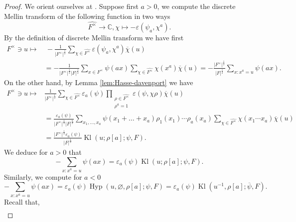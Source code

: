 \documentclass[12pt]{amsart}
\theoremstyle{plain}
\theoremstyle{definition}
\theoremstyle{remark}
\numberwithin{equation}{section}
\newcommand{\CC}{\mathbb{C}}
\DeclareMathOperator{\Kl}{Kl}%
\begin{document}
\begin{proof}
  We orient ourselves at \cite{FKMSthirdmom}. Suppose first $a>0$, we compute the discrete Mellin transform of the following function in two ways 
\begin{equation}\label{eq:Hasse-davenport2}
    \widehat{F^{\times}}\rightarrow \CC, \chi \mapsto -\varepsilon(\psi_a,\chi^a).
\end{equation}
By the definition of discrete Mellin transform we have first 
\begin{align}\label{eq:Hasse-davenport3}
    F^{\times}\ni u\mapsto&\ -\frac{1}{\vert{F^{\times}}\vert^{\frac{1}{2}}}\sum_{\chi \in \widehat{F^{\times}}}\varepsilon(\psi_a,\chi^a)\overline{\chi}(u) \nonumber \\ &=-\frac{1}{\vert{F^{\times}}\vert^{\frac{1}{2}}\vert{F}\vert^{\frac{1}{2}}}\sum_{x\in F^{\times}}\psi(ax)\sum_{\chi \in \widehat{F^{\times}}}\chi(x^a)\overline{\chi}(u) = -\frac{\vert{F^{\times}}\vert^{\frac{1}{2}}}{\vert{F}\vert^{\frac{1}{2}}}\sum_{x\colon x^a=u}\psi(ax).
\end{align}
On the other hand, by Lemma \ref{lem:Hasse-davenport} we have
\begin{align}\label{eq:Hasse-davenport4}
F^{\times}\ni u\mapsto & \frac{1}{\vert{F^{\times}}\vert^{\frac{1}{2}}}\sum_{\chi\in \widehat{F^{\times}}}\varepsilon_a(\psi)\prod_{\substack{\rho \in \widehat{F^{\times}}\\\rho^a=1}}\varepsilon(\psi,\chi\rho)\overline{\chi}(u) \nonumber \\ &= \frac{\varepsilon_a(\psi)}{\vert{F^{\times}}\vert^{\frac{1}{2}}\vert{F}\vert^{\frac{a}{2}}}\sum_{x_1,\dots,x_a}\psi(x_1+\dots+x_a)\rho_1(x_1)\cdots\rho_a(x_a)\sum_{\chi\in \widehat{F^{\times}}}\chi(x_1\cdots x_a)\overline{\chi}(u)\nonumber \\ &=\frac{\vert{F^{\times}}\vert^{\frac{1}{2}}\varepsilon_a(\psi)}{\vert{F}\vert^{\frac{1}{2}}}\Kl(u;\rho[a];\psi,F).
\end{align}
We deduce for $a>0$ that 
\begin{equation}\label{eq: K Kl connection}
    -\sum_{x:x^a=u}\psi(ax) =\varepsilon_a(\psi)\Kl(u;\rho[a];\psi,F).
\end{equation}
Similarly, we compute for $a<0$  
\begin{equation*}
    -\sum_{x:x^{a} =u}\psi(ax) 
    = \varepsilon_a(\psi)\operatorname{Hyp}(u,\varnothing,\rho[a];\psi,F) = \varepsilon_a(\psi)\Kl(u^{-1},\rho[a];\overline{\psi},F).
\end{equation*}
Recall that, 
\begin{align*}

\end{align*}
\end{proof}
\end{document}
